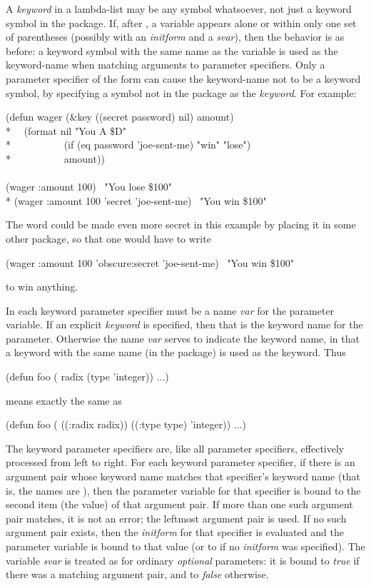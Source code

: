 A \emph{keyword} in a lambda-list
may be any symbol whatsoever, not just a keyword symbol
in the  package.  If, after ,
a variable appears alone or within only one set of parentheses
(possibly with an \emph{initform} and a \emph{svar}), then
the behavior is as before: a keyword symbol with the same name as
the variable is used as the keyword-name when matching arguments
to parameter specifiers.  Only a parameter specifier of the form
 can cause the keyword-name
not to be a keyword symbol, by specifying a symbol not in the 
package as the \emph{keyword}.
For example:
\begin{lisp}
(defun wager (\&key ((secret password) nil) amount) \\*
~~(format nil "You {\Xtilde}A \${\Xtilde}D" \\*
~~~~~~~~~~(if (eq password 'joe-sent-me) "win" "lose") \\*
~~~~~~~~~~amount)) \\
\\
(wager :amount 100) \EV\ "You lose \$100" \\*
(wager :amount 100 'secret 'joe-sent-me) \EV\ "You win \$100"
\end{lisp}
The  word could be made even more secret in this example
by placing it in some other  package, so that one would
have to write
\begin{lisp}
(wager :amount 100 'obscure:secret 'joe-sent-me) \EV\ "You win \$100"
\end{lisp}
to win anything.

In each keyword parameter specifier must be a name \emph{var} for the
parameter variable.  If an explicit \emph{keyword} is
specified, then that is the keyword name for the parameter.  Otherwise
the name \emph{var} serves to indicate the keyword name,
in that a keyword with the same name (in the  package) is used
as the keyword.  Thus
\begin{lisp}
(defun foo ( radix (type 'integer)) ...)
\end{lisp}
means exactly the same as
\begin{lisp}
(defun foo ( ((:radix radix)) ((:type type) 'integer)) ...)
\end{lisp}

The keyword parameter specifiers are, like all parameter specifiers,
effectively processed from left to right.
For each keyword parameter specifier, if there is an argument
pair whose keyword name matches that specifier's keyword name
(that is, the names are ),
then the parameter variable for that specifier is bound to the
second item (the value) of that argument pair.
If more than one such argument pair matches, it is not an error;
the leftmost argument pair is used.
If no such argument pair exists, then
the \emph{initform} for that specifier is evaluated
and the parameter variable is bound to that value (or to {\false} if
no \emph{initform} was specified).  The variable \emph{svar} is treated
as for ordinary \emph{optional} parameters: it is bound to \emph{true}
if there was a matching argument pair, and to \emph{false} otherwise.

